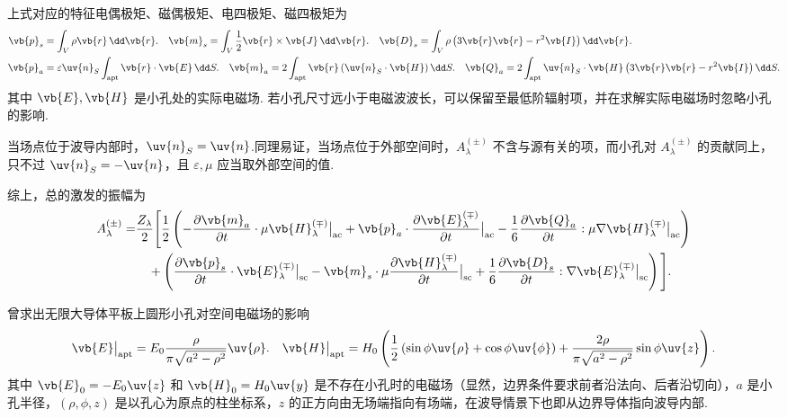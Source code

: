 上式对应的特征电偶极矩、磁偶极矩、电四极矩、磁四极矩为
\begin{align*}
	\vb{p}_s &= \int_V \rho \vb{r} \, \dd \vb{r}. \quad \vb{m}_s = \int_V \dfrac{1}{2} \vb{r} \times \vb{J} \, \dd \vb{r}. \quad \vb{D}_s = \int_V \rho \left( 3\vb{r}\vb{r} - r^2 \vb{I} \right) \dd \vb{r}.\\
	\vb{p}_a &= \varepsilon \uv{n}_S \int_{\text{apt}} \vb{r} \cdot \vb{E} \, \dd S. \quad \vb{m}_a = 2 \int_{\text{apt}} \vb{r} \left( \uv{n}_S \cdot \vb{H} \right) \dd S. \quad \vb{Q}_a = 2 \int_{\text{apt}} \uv{n}_S \cdot \vb{H} \left( 3\vb{r}\vb{r} - r^2 \vb{I} \right) \dd S.
\end{align*}
其中 \(\vb{E}, \vb{H}\) 是小孔处的实际电磁场. 若小孔尺寸远小于电磁波波长，可以保留至最低阶辐射项，并在求解实际电磁场时忽略小孔的影响.

当场点位于波导内部时，\(\uv{n}_S = \uv{n}\).同理易证，当场点位于外部空间时，\(A_{\lambda}^{(\pm)}\) 不含与源有关的项，而小孔对 \(A_{\lambda}^{(\pm)}\) 的贡献同上，只不过 \(\uv{n}_S = -\uv{n}\)，且 \(\varepsilon, \mu\) 应当取外部空间的值.

综上，总的激发的振幅为
\begin{align*}
	A_{\lambda}^{(\pm)} = &\dfrac{Z_{\lambda}}{2} \Bigg[ \dfrac{1}{2} \left( -\dfrac{\partial \vb{m}_a}{\partial t} \cdot \mu \vb{H}_{\lambda}^{(\mp)} \big|_{\text{ac}} + \vb{p}_a \cdot \dfrac{\partial \vb{E}_{\lambda}^{(\mp)}}{\partial t} \big|_{\text{ac}} - \dfrac{1}{6} \dfrac{\partial \vb{Q}_a}{\partial t} : \mu \nabla \vb{H}_{\lambda}^{(\mp)} \big|_{\text{ac}} \right)\\ &\quad+ \left( \dfrac{\partial \vb{p}_s}{\partial t} \cdot \vb{E}_{\lambda}^{(\mp)} \big|_{\text{sc}} - \vb{m}_s \cdot \mu \dfrac{\partial \vb{H}_{\lambda}^{(\mp)}}{\partial t}\big|_{\text{sc}} + \dfrac{1}{6} \dfrac{\partial \vb{D}_s}{\partial t} : \nabla \vb{E}_{\lambda}^{(\mp)} \big|_{\text{sc}} \right) \Bigg].
\end{align*}
\begin{note}
	曾求出无限大导体平板上圆形小孔对空间电磁场的影响
	\begin{align*}
		\vb{E} \big|_{\text{apt}} = E_0 \dfrac{\rho}{\pi \sqrt{a^2 - \rho^2}} \uv{\rho}. \quad \vb{H} \big|_{\text{apt}} = H_0 \left( \dfrac{1}{2} \left( \sin\phi \uv{\rho} + \cos\phi \uv{\phi} \right) + \dfrac{2\rho}{\pi \sqrt{a^2 - \rho^2}} \sin\phi \uv{z} \right).
	\end{align*}
	其中 \(\vb{E}_0 = -E_0 \uv{z}\) 和 \(\vb{H}_0 = H_0 \uv{y}\) 是不存在小孔时的电磁场（显然，边界条件要求前者沿法向、后者沿切向），\(a\) 是小孔半径，\((\rho, \phi, z)\) 是以孔心为原点的柱坐标系，\(z\) 的正方向由无场端指向有场端，在波导情景下也即从边界导体指向波导内部.
\end{note}


